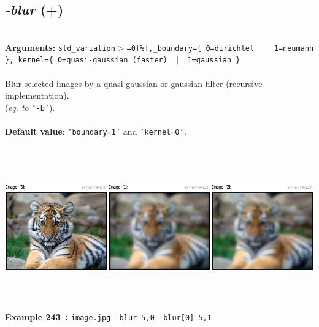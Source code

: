 \documentclass[a4paper,11pt,twoside]{book}
\begin{document}
\subsection{\emph{-blur} (+)}\vspace*{-0.5em}
~\\\textbf{Arguments: } 
{\small \texttt{std\_variation$>$=0[\%],\_boundary=\{ 0=dirichlet ~$|$~ 1=neumann \},\_kernel=\{ 0=quasi-gaussian (faster) ~$|$~ 1=gaussian \}}}\\~\\
Blur selected images by a quasi-gaussian or gaussian filter (recursive implementation).
~\\(\emph{eq. to} {\small \texttt{'-b'}}).
~\\~\\\textbf{Default value}: {\small \texttt{'boundary=1'} and \texttt{'kernel=0'.}}
\begin{center}\includegraphics[keepaspectratio=true,height=7cm,width=\textwidth]{img/gmic_def243.jpg}\\
{\footnotesize \textbf{Example 243~:} \texttt{image.jpg --blur 5,0 --blur[0] 5,1}}
\end{center}
\end{document}

